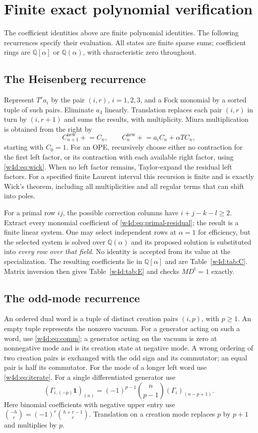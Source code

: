 \section{Finite exact polynomial verification}\label{w4d:app:finite}
The coefficient identities above are finite polynomial identities. The following recurrences specify their evaluation. All states are finite sparse sums; coefficient rings are $\mathbb Q[\alpha]$ or $\mathbb Q(\alpha)$, with characteristic zero throughout.

\subsection{The Heisenberg recurrence}
Represent $T^ra_i$ by the pair $(i,r)$, $i=1,2,3$, and a Fock monomial by a sorted tuple of such pairs. Eliminate $a_4$ linearly. Translation replaces each pair $(i,r)$ in turn by $(i,r+1)$ and sums the results, with multiplicity. Miura multiplication is obtained from the right by
\[
 C_{n+1}^{\mathrm{new}}\mathrel{+}=C_n,\qquad
 C_n^{\mathrm{new}}\mathrel{+}=a_iC_n+\alpha TC_n,
\]
starting with $C_0=1$. For an OPE, recursively choose either no contraction for the first left factor, or its contraction with each available right factor, using \eqref{w4d:eq:wick}. When no left factor remains, Taylor-expand the residual left factors. For a specified finite Laurent interval this recursion is finite and is exactly Wick's theorem, including all multiplicities and all regular terms that can shift into poles.

For a primal row $ij$, the possible correction columns have $i+j-k-l\geq2$. Extract every monomial coefficient of \eqref{w4d:eq:primal-residual}; the result is a finite linear system. One may select independent rows at $\alpha=1$ for efficiency, but the selected system is solved over $\mathbb Q(\alpha)$ and its proposed solution is substituted into \emph{every row over that field}. No identity is accepted from its value at the specialization. The resulting coefficients lie in $\mathbb Q[\alpha]$ and are Table~\ref{w4d:tab:C}. Matrix inversion then gives Table~\ref{w4d:tab:E} and checks $MD^{\mathrm t}=1$ exactly.

\subsection{The odd-mode recurrence}
An ordered dual word is a tuple of distinct creation pairs $(i,p)$, with $p\geq1$. An empty tuple represents the nonzero vacuum. For a generator acting on such a word, use \eqref{w4d:eq:comm}; a generator acting on the vacuum is zero at nonnegative mode and is its creation state at negative mode. A wrong ordering of two creation pairs is exchanged with the odd sign and its commutator; an equal pair is half its commutator. For the mode of a longer left word use \eqref{w4d:eq:iterate}. For a single differentiated generator use
\[
 (\Gamma_{i,(-p)}\mathbf1)_{(n)}
  =(-1)^{p-1}\binom{n}{p-1}(\Gamma_i)_{(n-p+1)}.
\]
Here binomial coefficients with negative upper entry use
$\binom{-h}{r}=(-1)^r\binom{h+r-1}{r}$. Translation on a creation mode replaces $p$ by $p+1$ and multiplies by $p$.

